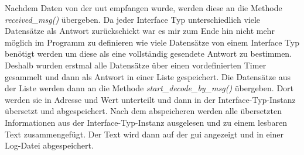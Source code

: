 Nachdem Daten von der \ac{uut} empfangen wurde, werden diese an die Methode \textit{received\_msg()} übergeben. Da jeder Interface Typ unterschiedlich viele Datensätze als Antwort zurückschickt war es mir zum Ende hin nicht mehr möglich im Programm zu definieren wie viele Datensätze von einem Interface Typ benötigt werden um diese als eine vollständig gesendete Antwort zu bestimmen. Deshalb wurden erstmal alle Datensätze über einen vordefinierten Timer gesammelt und dann als Antwort in einer Liste gespeichert. Die Datensätze aus der Liste werden dann an die Methode \textit{start\_decode\_by\_msg()} übergeben. Dort werden sie in Adresse und Wert unterteilt und dann in der Interface-Typ-Instanz übersetzt und abgespeichert. Nach dem abspeicheren werden alle übersetzten Informationen aus der Interface-Typ-Instanz ausgelesen und zu einem lesbaren Text zusammengefügt. Der Text wird dann auf der \ac{gui} angezeigt und in einer Log-Datei abgespeichert.